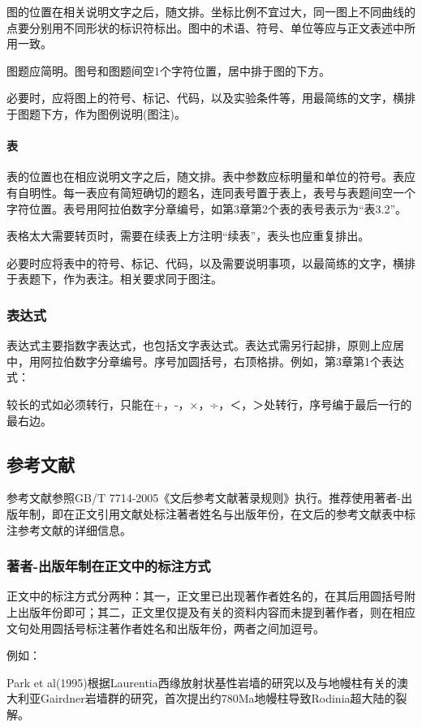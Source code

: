 图的位置在相关说明文字之后，随文排。坐标比例不宜过大，同一图上不同曲线的点要分别用不同形状的标识符标出。图中的术语、符号、单位等应与正文表述中所用一致。

图题应简明。图号和图题间空1个字符位置，居中排于图的下方。

必要时，应将图上的符号、标记、代码，以及实验条件等，用最简练的文字，横排于图题下方，作为图例说明(图注)。

\paragraph{表}
表的位置也在相应说明文字之后，随文排。表中参数应标明量和单位的符号。表应有自明性。每一表应有简短确切的题名，连同表号置于表上，表号与表题间空一个字符位置。表号用阿拉伯数字分章编号，如第3章第2个表的表号表示为“表3.2”。

表格太大需要转页时，需要在续表上方注明“续表”，表头也应重复排出。

必要时应将表中的符号、标记、代码，以及需要说明事项，以最简练的文字，横排于表题下，作为表注。相关要求同于图注。

\subsubsection{表达式}
表达式主要指数字表达式，也包括文字表达式。表达式需另行起排，原则上应居中，用阿拉伯数字分章编号。序号加圆括号，右顶格排。例如，第3章第1个表达式：

较长的式如必须转行，只能在+，-，×，÷，＜，＞处转行，序号编于最后一行的最右边。

\subsection{参考文献}
参考文献参照GB/T 7714-2005《文后参考文献著录规则》执行。推荐使用著者-出版年制，即在正文引用文献处标注著者姓名与出版年份，在文后的参考文献表中标注参考文献的详细信息。
\subsubsection{著者-出版年制在正文中的标注方式}

正文中的标注方式分两种：其一，正文里已出现著作者姓名的，在其后用圆括号附上出版年份即可；其二，正文里仅提及有关的资料内容而未提到著作者，则在相应文句处用圆括号标注著作者姓名和出版年份，两者之间加逗号。

例如：

Park et al(1995)根据Laurentia西缘放射状基性岩墙的研究以及与地幔柱有关的澳大利亚Gairdner岩墙群的研究，首次提出约780Ma地幔柱导致Rodinia超大陆的裂解。

